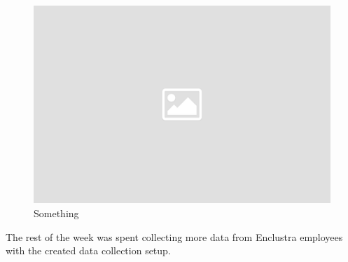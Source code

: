 \begin{figure}[!htb]
	\centering
		\includegraphics[width=\textwidth]{bilder/placeholder.png}
		\caption{Something}
		\label{fig:something}
\end{figure}
The rest of the week was spent collecting more data from Enclustra employees with the created data collection setup.